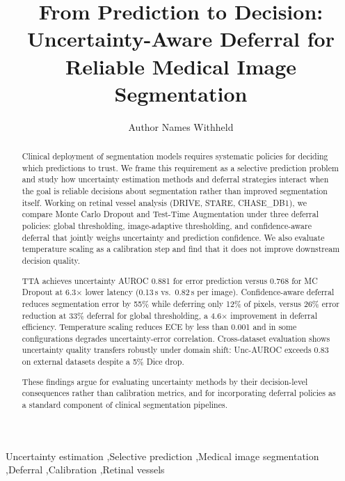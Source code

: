 \documentclass[review,3p]{elsarticle}
\begin{document}
\begin{frontmatter}

\title{From Prediction to Decision: Uncertainty-Aware Deferral for Reliable Medical Image Segmentation}

\author{Author Names Withheld}
\address{Institution Withheld}

\begin{abstract}
Clinical deployment of segmentation models requires systematic policies for
deciding which predictions to trust. We frame this requirement as a selective
prediction problem and study how uncertainty estimation methods and deferral
strategies interact when the goal is reliable decisions about segmentation
rather than improved segmentation itself. Working on retinal vessel analysis
(DRIVE, STARE, CHASE\_DB1), we compare Monte Carlo Dropout and Test-Time
Augmentation under three deferral policies: global thresholding, image-adaptive
thresholding, and confidence-aware deferral that jointly weighs uncertainty and
prediction confidence. We also evaluate temperature scaling as a calibration
step and find that it does not improve downstream decision quality.

TTA achieves uncertainty AUROC 0.881 for error prediction versus 0.768 for MC
Dropout at 6.3$\times$ lower latency (0.13\,s vs.\ 0.82\,s per image).
Confidence-aware deferral reduces segmentation error by 55\% while deferring
only 12\% of pixels, versus 26\% error reduction at 33\% deferral for global
thresholding, a 4.6$\times$ improvement in deferral efficiency. Temperature
scaling reduces ECE by less than 0.001 and in some configurations degrades
uncertainty-error correlation. Cross-dataset evaluation shows uncertainty
quality transfers robustly under domain shift: Unc-AUROC exceeds 0.83 on
external datasets despite a 5\% Dice drop.

These findings argue for evaluating uncertainty methods by their decision-level
consequences rather than calibration metrics, and for incorporating deferral
policies as a standard component of clinical segmentation pipelines.
\end{abstract}

\begin{keyword}
Uncertainty estimation \sep Selective prediction \sep Medical image
segmentation \sep Deferral \sep Calibration \sep Retinal vessels
\end{keyword}

\end{frontmatter}

\linenumbers
\end{document}
